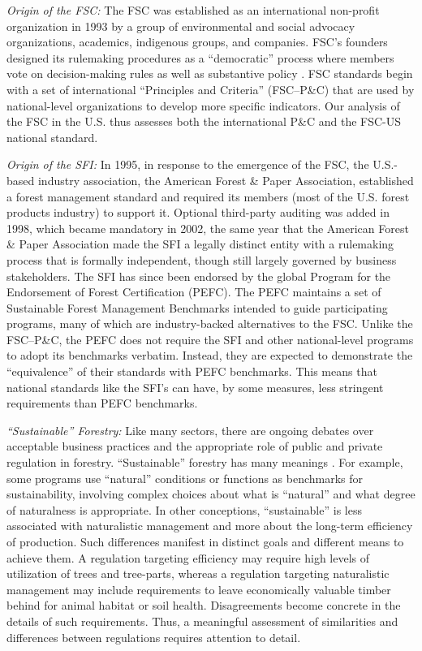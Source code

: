 \documentclass[
      12pt,
            Review ]{article}
\begin{document}
\emph{Origin of the FSC:} The FSC was established as an international
non-profit organization in 1993 by a group of environmental and social
advocacy organizations, academics, indigenous groups, and companies.
FSC's founders designed its rulemaking procedures as a ``democratic''
process where members vote on decision-making rules as well as
substantive policy \citep{Meidinger2003}. FSC standards begin with a set
of international ``Principles and Criteria'' (FSC--P\&C) that are used
by national-level organizations to develop more specific indicators. Our
analysis of the FSC in the U.S. thus assesses both the international
P\&C and the FSC-US national standard.

\emph{Origin of the SFI:} In 1995, in response to the emergence of the
FSC, the U.S.-based industry association, the American Forest \& Paper
Association, established a forest management standard and required its
members (most of the U.S. forest products industry) to support it.
Optional third-party auditing was added in 1998, which became mandatory
in 2002, the same year that the American Forest \& Paper Association
made the SFI a legally distinct entity with a rulemaking process that is
formally independent, though still largely governed by business
stakeholders. The SFI has since been endorsed by the global Program for
the Endorsement of Forest Certification (PEFC). The PEFC maintains a set
of Sustainable Forest Management Benchmarks intended to guide
participating programs, many of which are industry-backed alternatives
to the FSC. Unlike the FSC--P\&C, the PEFC does not require the SFI and
other national-level programs to adopt its benchmarks verbatim. Instead,
they are expected to demonstrate the ``equivalence'' of their standards
with PEFC benchmarks. This means that national standards like the SFI's
can have, by some measures, less stringent requirements than PEFC
benchmarks.

\emph{``Sustainable'' Forestry:} Like many sectors, there are ongoing
debates over acceptable business practices and the appropriate role of
public and private regulation in forestry. ``Sustainable'' forestry has
many meanings \citep{McDermott2012}. For example, some programs use
``natural'' conditions or functions as benchmarks for sustainability,
involving complex choices about what is ``natural'' and what degree of
naturalness is appropriate. In other conceptions, ``sustainable'' is
less associated with naturalistic management and more about the
long-term efficiency of production. Such differences manifest in
distinct goals and different means to achieve them. A regulation
targeting efficiency may require high levels of utilization of trees and
tree-parts, whereas a regulation targeting naturalistic management may
include requirements to leave economically valuable timber behind for
animal habitat or soil health. Disagreements become concrete in the
details of such requirements. Thus, a meaningful assessment of
similarities and differences between regulations requires attention to
detail.
\end{document}
